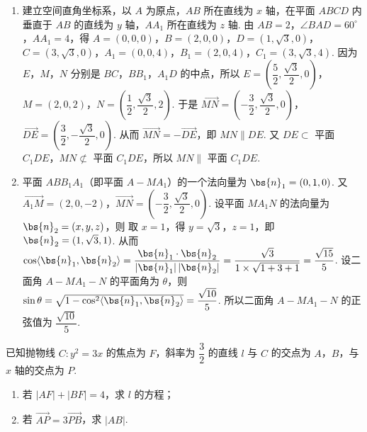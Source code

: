 \begin{solution}
\begin{enumerate}
\item 建立空间直角坐标系，以 \(A\) 为原点，\(AB\) 所在直线为 \(x\) 轴，在平面 \(ABCD\) 内垂直于 \(AB\) 的直线为 \(y\) 轴，\(AA_1\) 所在直线为 \(z\) 轴. 由 \(AB=2\)，\(\angle BAD=60^\circ\)，\(AA_1=4\)，得 \(A=(0,0,0)\)，\(B=(2,0,0)\)，\(D=(1,\sqrt3,0)\)，\(C=(3,\sqrt3,0)\)，\(A_1=(0,0,4)\)，\(B_1=(2,0,4)\)，\(C_1=(3,\sqrt3,4)\). 因为 \(E\)，\(M\)，\(N\) 分别是 \(BC\)，\(BB_1\)，\(A_1D\) 的中点，所以 \(E=\left(\dfrac52,\dfrac{\sqrt3}{2},0\right)\)，\(M=(2,0,2)\)，\(N=\left(\dfrac12,\dfrac{\sqrt3}{2},2\right)\). 于是 \(\overrightarrow{MN}=\left(-\dfrac32,\dfrac{\sqrt3}{2},0\right)\)，\(\overrightarrow{DE}=\left(\dfrac32,-\dfrac{\sqrt3}{2},0\right)\). 从而 \(\overrightarrow{MN}=-\overrightarrow{DE}\)，即 \(MN\parallel DE\). 又 \(DE\subset\) 平面 \(C_1DE\)，\(MN\not\subset\) 平面 \(C_1DE\)，所以 \(MN\parallel\) 平面 \(C_1DE\).
\item 平面 \(ABB_1A_1\)（即平面 \(A-MA_1\)）的一个法向量为 \(\bs{n}_1=(0,1,0)\). 又 \(\overrightarrow{A_1M}=(2,0,-2)\)，\(\overrightarrow{MN}=\left(-\dfrac32,\dfrac{\sqrt3}{2},0\right)\). 设平面 \(MA_1N\) 的法向量为 \(\bs{n}_2=(x,y,z)\)，则
取 \(x=1\)，得 \(y=\sqrt3\)，\(z=1\)，即 \(\bs{n}_2=(1,\sqrt3,1)\). 从而 \(\cos\langle\bs{n}_1,\bs{n}_2\rangle=\dfrac{\bs{n}_1\cdot\bs{n}_2}{|\bs{n}_1|\,|\bs{n}_2|}=\dfrac{\sqrt3}{1\times\sqrt{1+3+1}}=\dfrac{\sqrt{15}}{5}\). 设二面角 \(A-MA_1-N\) 的平面角为 \(\theta\)，则 \(\sin\theta=\sqrt{1-\cos^2\langle\bs{n}_1,\bs{n}_2\rangle}=\dfrac{\sqrt{10}}{5}\). 所以二面角 \(A-MA_1-N\) 的正弦值为 \(\dfrac{\sqrt{10}}{5}\).
\end{enumerate}
\end{solution}

\begin{problem}
已知抛物线 \(C:y^2=3x\) 的焦点为 \(F\)，斜率为 \(\dfrac32\) 的直线 \(l\) 与 \(C\) 的交点为 \(A\)，\(B\)，与 \(x\) 轴的交点为 \(P\).

\begin{enumerate}
\item 若 \(|AF|+|BF|=4\)，求 \(l\) 的方程；

\item 若 \(\overrightarrow{AP}=3\overrightarrow{PB}\)，求 \(|AB|\).
\end{enumerate}
\end{problem}


